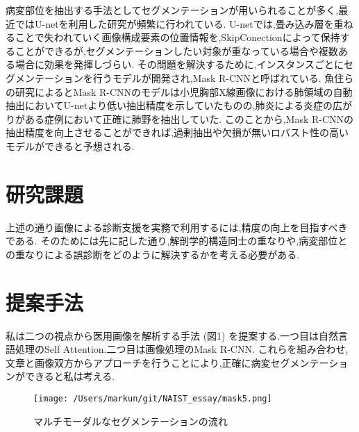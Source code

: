 \documentclass[a4j,10pt, twocolumn]{jarticle}
\begin{document}
病変部位を抽出する手法としてセグメンテーションが用いられることが多く,最近ではU-netを利用した研究が頻繁に行われている\cite{近藤堅司2018u}.
U-netでは,畳み込み層を重ねることで失われていく画像構成要素の位置情報を,SkipConectionによって保持することができるが,セグメンテーションしたい対象が重なっている場合や複数ある場合に効果を発揮しづらい.
その問題を解決するために,インスタンスごとにセグメンテーションを行うモデルが開発され,Mask R-CNNと呼ばれている\cite{he2017mask}.
魚住らの研究によるとMask R-CNNのモデルは小児胸部X線画像における肺領域の自動抽出においてU-netより低い抽出精度を示していたものの,肺炎による炎症の広がりがある症例において正確に肺野を抽出していた\cite{魚住春日2020mask}.
このことから,Mask R-CNNの抽出精度を向上させることができれば,過剰抽出や欠損が無いロバスト性の高いモデルができると予想される.

\section{研究課題}
上述の通り画像による診断支援を実務で利用するには,精度の向上を目指すべきである.
そのためには先に記した通り,解剖学的構造同士の重なりや,病変部位との重なりによる誤診断をどのように解決するかを考える必要がある.

\section{提案手法}
私は二つの視点から医用画像を解析する手法 (図1) を提案する.一つ目は自然言語処理のSelf Attention\cite{vaswani2017attention}.二つ目は画像処理のMask R-CNN.
これらを組み合わせ,文章と画像双方からアプローチを行うことにより,正確に病変セグメンテーションができると私は考える.

\begin{figure}[ht]%
    \texttt{[image: /Users/markun/git/NAIST\_essay/mask5.png]}
    \caption{マルチモーダルなセグメンテーションの流れ}
\end{figure}

\end{document}

